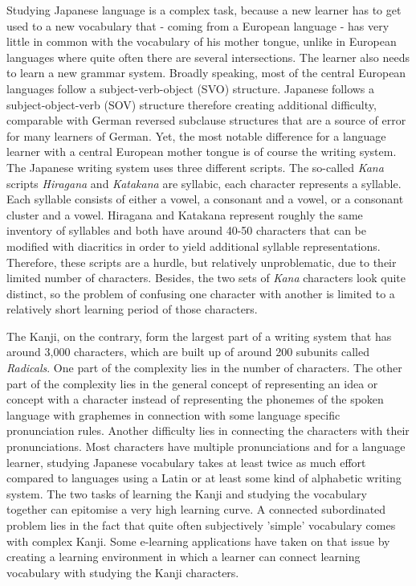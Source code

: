 Studying Japanese language is a complex task, because a new learner has to get 
used to a new vocabulary that - coming from a European language - has very 
little in common with the vocabulary of his mother tongue, unlike in European 
languages where quite often there are several intersections. The learner also 
needs to learn a new grammar system. Broadly speaking, most of the central 
European languages follow a subject-verb-object (SVO) structure. 
Japanese follows a subject-object-verb (SOV) structure therefore creating 
additional difficulty, comparable with German reversed subclause structures that 
are a source of error for many learners of German. 
Yet, the most notable difference for a language learner with a central European 
mother tongue is of course the writing system. The Japanese writing system uses 
three different scripts. The so-called \emph{Kana} scripts \emph{Hiragana} and 
\emph{Katakana} are syllabic, each character represents a syllable. Each syllable
consists of either a vowel, a consonant and a vowel, or a consonant cluster and 
a vowel. Hiragana and Katakana represent roughly the same inventory of syllables
and both have around 40-50 characters that can be modified with diacritics in 
order to yield additional syllable representations. Therefore, these scripts are 
a hurdle, but relatively unproblematic, due to their limited number of 
characters. Besides, the two sets of \emph{Kana} characters look quite distinct, 
so the problem of confusing one character with another is limited to a relatively
short learning period of those characters.

The Kanji, on the contrary, form the largest part of a writing system that has 
around 3,000 characters, which are built up of around 200 subunits called 
\emph{Radicals}. 
One part of the complexity lies in the number of characters. 
The other part of the complexity lies in the general concept of representing an 
idea or concept with a character instead of representing the phonemes of the 
spoken language with graphemes in connection with some language specific 
pronunciation rules. 
Another difficulty lies in connecting the characters with their pronunciations. 
Most characters have multiple pronunciations and for a language learner, 
studying Japanese vocabulary takes at least twice as much effort compared to 
languages using a Latin or at least some kind of alphabetic writing system. 
The two tasks of learning the Kanji and studying the vocabulary together can 
epitomise a very high learning curve. A connected subordinated problem lies
in the fact that quite often subjectively 'simple' vocabulary comes with 
complex Kanji. Some e-learning applications have taken on that issue by creating 
a learning environment in which a learner can connect learning vocabulary with 
studying the Kanji characters.

